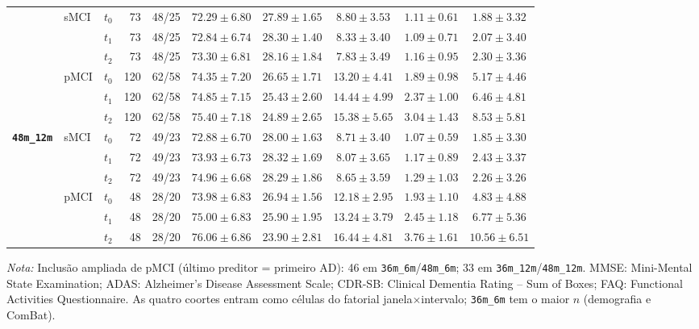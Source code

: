 \documentclass[review]{elsarticle}
\newcommand{\code}[1]{\texttt{#1}}
\begin{document}
\begin{table}[htbp]
{\begin{tabular}{lllrrccccc}
				& \multirow{3}{*}{sMCI}
				& $t_0$ & 73 & 48/25 & $72.29\pm6.80$ & $27.89\pm1.65$ & $8.80\pm3.53$ & $1.11\pm0.61$ & $1.88\pm3.32$ \\
				& & $t_1$ & 73 & 48/25 & $72.84\pm6.74$ & $28.30\pm1.40$ & $8.33\pm3.40$ & $1.09\pm0.71$ & $2.07\pm3.40$ \\
				& & $t_2$ & 73 & 48/25 & $73.30\pm6.81$ & $28.16\pm1.84$ & $7.83\pm3.49$ & $1.16\pm0.95$ & $2.30\pm3.36$ \\
				\cmidrule{2-10}
				& \multirow{3}{*}{pMCI}
				& $t_0$ & 120 & 62/58 & $74.35\pm7.20$ & $26.65\pm1.71$ & $13.20\pm4.41$ & $1.89\pm0.98$ & $5.17\pm4.46$ \\
				& & $t_1$ & 120 & 62/58 & $74.85\pm7.15$ & $25.43\pm2.60$ & $14.44\pm4.99$ & $2.37\pm1.00$ & $6.46\pm4.81$ \\
				& & $t_2$ & 120 & 62/58 & $75.40\pm7.18$ & $24.89\pm2.65$ & $15.38\pm5.65$ & $3.04\pm1.43$ & $8.53\pm5.81$ \\
				\midrule
				\multirow{6}{*}{\textbf{\code{48m\_12m}}}
				& \multirow{3}{*}{sMCI}
				& $t_0$ & 72 & 49/23 & $72.88\pm6.70$ & $28.00\pm1.63$ & $8.71\pm3.40$ & $1.07\pm0.59$ & $1.85\pm3.30$ \\
				& & $t_1$ & 72 & 49/23 & $73.93\pm6.73$ & $28.32\pm1.69$ & $8.07\pm3.65$ & $1.17\pm0.89$ & $2.43\pm3.37$ \\
				& & $t_2$ & 72 & 49/23 & $74.96\pm6.68$ & $28.29\pm1.86$ & $8.65\pm3.59$ & $1.29\pm1.03$ & $2.26\pm3.26$ \\
				\cmidrule{2-10}
				& \multirow{3}{*}{pMCI}
				& $t_0$ & 48 & 28/20 & $73.98\pm6.83$ & $26.94\pm1.56$ & $12.18\pm2.95$ & $1.93\pm1.10$ & $4.83\pm4.88$ \\
				& & $t_1$ & 48 & 28/20 & $75.00\pm6.83$ & $25.90\pm1.95$ & $13.24\pm3.79$ & $2.45\pm1.18$ & $6.77\pm5.36$ \\
				& & $t_2$ & 48 & 28/20 & $76.06\pm6.86$ & $23.90\pm2.81$ & $16.44\pm4.81$ & $3.76\pm1.61$ & $10.56\pm6.51$ \\
				\bottomrule
			\end{tabular}%
		}
		\begin{flushleft}
			\footnotesize
			\textit{Nota:} Inclusão ampliada de pMCI (último preditor = primeiro AD): 46 em \code{36m\_6m}/\code{48m\_6m}; 33 em \code{36m\_12m}/\code{48m\_12m}.
			MMSE: Mini-Mental State Examination; ADAS: Alzheimer's Disease Assessment Scale; CDR-SB: Clinical Dementia Rating -- Sum of Boxes; FAQ: Functional Activities Questionnaire.
			As quatro coortes entram como células do fatorial janela$\times$intervalo; \code{36m\_6m} tem o maior $n$ (demografia e ComBat).
		\end{flushleft}
	\end{table}
	
\end{document}
